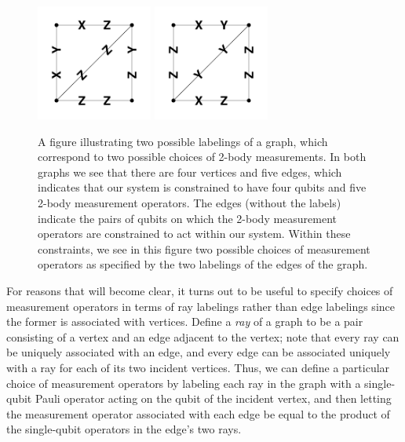 \documentclass{amsbook}
\theoremstyle{plain}
\theoremstyle{definition}
\theoremstyle{remark}
\begin{document}
\begin{figure}
\begin{center}
\includegraphics[width=1.5in]{images/2labelings-1}
\includegraphics[width=1.5in]{images/2labelings-2}
\end{center}
\caption{
\label{figure:2labelings}
A figure illustrating two possible labelings of a graph, which correspond to two possible choices of 2-body measurements.  In both graphs we see that there are four vertices and five edges, which indicates that our system is constrained to have four qubits and five 2-body measurement operators.  The edges (without the labels) indicate the pairs of qubits on which the 2-body measurement operators are constrained to act within our system.  Within these constraints, we see in this figure two possible choices of measurement operators as specified by the two labelings of the edges of the graph.
}
\end{figure}

For reasons that will become clear, it turns out to be useful to specify choices of measurement operators in terms of ray labelings rather than edge labelings since the former is associated with vertices.  Define a \emph{ray} of a graph to be a pair consisting of a vertex and an edge adjacent to the vertex;  note that every ray can be uniquely associated with an edge, and every edge can be associated uniquely with a ray for each of its two incident vertices.  Thus, we can define a particular choice of measurement operators by labeling each ray in the graph with a single-qubit Pauli operator acting on the qubit of the incident vertex, and then letting the measurement operator associated with each edge be equal to the product of the single-qubit operators in the edge's two rays.
\end{document}
